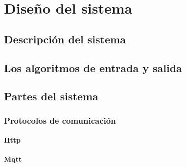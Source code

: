 \chapter{Diseño del sistema}

\section{Descripción del sistema}

\section{Los algoritmos de entrada y salida}

\section{Partes del sistema}

\subsection{Protocolos de comunicación}

\subsubsection*{Http}

\subsubsection*{Mqtt}